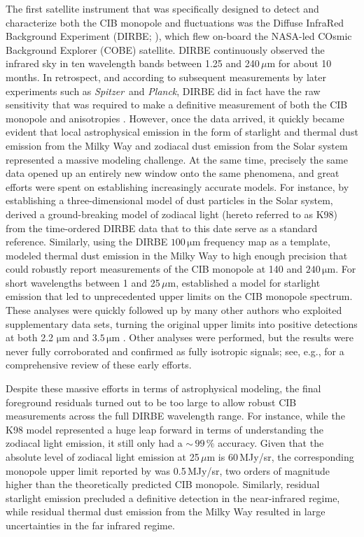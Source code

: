 \documentclass{aa}
\def\Planck{\textit{Planck}}
\def\Spitzer{\textit{Spitzer}}
\begin{document}
The first satellite instrument that was specifically designed to detect and characterize both the CIB monopole and fluctuations was the Diffuse InfraRed Background Experiment (DIRBE; \citealp{hauser1998}), which flew on-board the NASA-led COsmic Background Explorer (COBE) satellite. DIRBE continuously observed the infrared sky in ten wavelength bands between 1.25 and 240\,$\mu\mathrm{m}$ for about 10 months. In retrospect, and according to subsequent measurements by later experiments such as \Spitzer\ and \Planck, DIRBE did in fact have the raw sensitivity that was required to make a definitive measurement of both the CIB monopole and anisotropies \citep{boggess92,hauser1998}. However, once the data arrived, it quickly became evident that local astrophysical emission in the form of starlight and thermal dust emission from the Milky Way and zodiacal dust emission from the Solar system represented a massive modeling challenge. At the same time, precisely the same data opened up an entirely new window onto the same phenomena, and great efforts were spent on establishing increasingly accurate models. For instance, by establishing a three-dimensional model of dust particles in the Solar system, \citet{kelsall1998} derived a ground-breaking model of zodiacal light (hereto referred to as K98) from the time-ordered DIRBE data that to this date serve as a standard reference. Similarly, using the DIRBE $100\,\mathrm{\mu m}$ frequency map as a template, \citet{arendt1998} modeled thermal dust emission in the Milky Way to high enough precision that \citet{hauser1998} could robustly report measurements of the CIB monopole at 140 and $240\,\mathrm{\mu m}$. For short wavelengths between 1 and 25$\,\mu\mathrm{m}$, \citet{arendt1998} established a model for starlight emission that led to unprecedented upper limits on the CIB monopole spectrum. These analyses were quickly followed up by many other authors who exploited supplementary data sets, turning the original upper limits into positive detections at both 2.2 $\mathrm{\mu m}$ \citep{wright:2000,gorjian:2000,wright:2001} and $3.5\,\mathrm{\mu m}$ \citep{dwek:1998b,gorjian:2000,wright:2000}. Other analyses were performed, but the results were never fully corroborated and confirmed as fully isotropic signals; see, e.g., \citet{hauser:2001} for a comprehensive review of these early efforts.

Despite these massive efforts in terms of astrophysical modeling, the final foreground residuals turned out to be too large to allow robust CIB measurements across the full DIRBE wavelength range. For instance, while the K98 model represented a huge leap forward in terms of understanding the zodiacal light emission, it still only had a $\sim$\,$99\,\%$ accuracy. Given that the absolute level of zodiacal light emission at 25$\,\mu\mathrm{m}$ is 60\,MJy/sr, the corresponding monopole upper limit reported by \citet{hauser1998} was 0.5\,MJy/sr, two orders of magnitude higher than the theoretically predicted CIB monopole. Similarly, residual starlight emission precluded a definitive detection in the near-infrared regime, while residual thermal dust emission from the Milky Way resulted in large uncertainties in the far infrared regime. 
\end{document}
